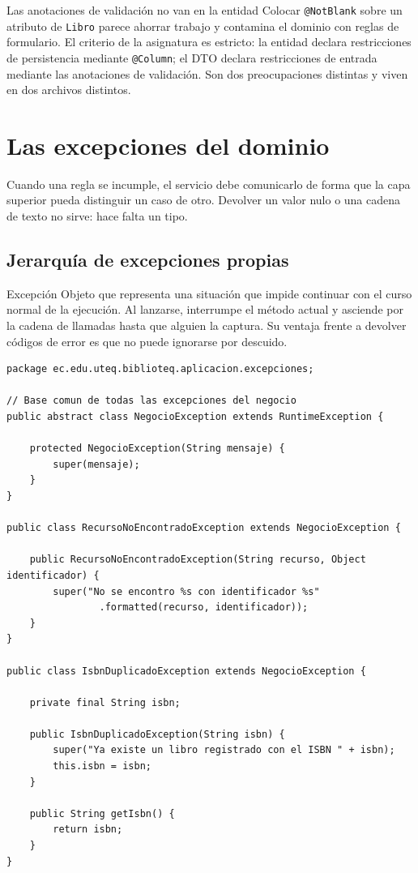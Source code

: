 \documentclass[11pt,a4paper,openany]{book}
\begin{document}
\begin{cajaadvertencia}{Las anotaciones de validación no van en la entidad}
	Colocar \texttt{@NotBlank} sobre un atributo de \texttt{Libro} parece ahorrar trabajo y contamina el dominio con reglas de formulario. El criterio de la asignatura es estricto: la entidad declara restricciones de persistencia mediante \texttt{@Column}; el DTO declara restricciones de entrada mediante las anotaciones de validación. Son dos preocupaciones distintas y viven en dos archivos distintos.
\end{cajaadvertencia}

\section{Las excepciones del dominio}
\label{sec:excepciones}

Cuando una regla se incumple, el servicio debe comunicarlo de forma que la capa superior pueda distinguir un caso de otro. Devolver un valor nulo o una cadena de texto no sirve: hace falta un tipo.

\subsection{Jerarquía de excepciones propias}
\label{sec:jerarquia-excepciones}

\begin{cajadefinicion}{Excepción}
	Objeto que representa una situación que impide continuar con el curso normal de la ejecución. Al lanzarse, interrumpe el método actual y asciende por la cadena de llamadas hasta que alguien la captura. Su ventaja frente a devolver códigos de error es que no puede ignorarse por descuido.
\end{cajadefinicion}

\begin{lstlisting}[style=java,caption={Excepciones propias del dominio del catalogo.},label={lst:excepciones}]
package ec.edu.uteq.biblioteq.aplicacion.excepciones;

// Base comun de todas las excepciones del negocio
public abstract class NegocioException extends RuntimeException {

	protected NegocioException(String mensaje) {
		super(mensaje);
	}
}

public class RecursoNoEncontradoException extends NegocioException {

	public RecursoNoEncontradoException(String recurso, Object identificador) {
		super("No se encontro %s con identificador %s"
				.formatted(recurso, identificador));
	}
}

public class IsbnDuplicadoException extends NegocioException {

	private final String isbn;

	public IsbnDuplicadoException(String isbn) {
		super("Ya existe un libro registrado con el ISBN " + isbn);
		this.isbn = isbn;
	}

	public String getIsbn() {
		return isbn;
	}
}
\end{lstlisting}
\end{document}
